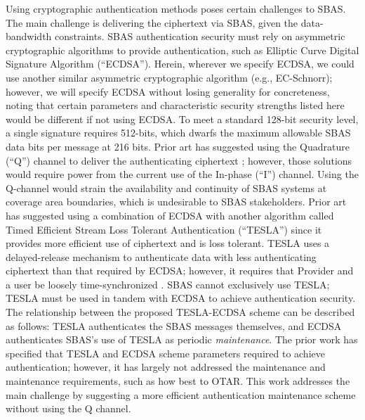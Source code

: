 \documentclass[letterpaper,times]{IONconf/IONconf}
\begin{document}
Using cryptographic authentication methods poses certain challenges to SBAS.
The main challenge is delivering the ciphertext via SBAS, given the data-bandwidth constraints.
SBAS authentication security must rely on asymmetric cryptographic algorithms to provide authentication, such as Elliptic Curve Digital Signature Algorithm (``ECDSA'').
Herein, wherever we specify ECDSA, we could use another similar asymmetric cryptographic algorithm (e.g., EC-Schnorr); however, we will specify ECDSA without losing generality for concreteness, noting that certain parameters and characteristic security strengths listed here would be different if not using ECDSA.
To meet a standard 128-bit security level, a single signature requires 512-bits, which dwarfs the maximum allowable SBAS data bits per message at 216 bits.
Prior art has suggested using the Quadrature (``Q'') channel to deliver the authenticating ciphertext \cite{other_schemes}; however, those solutions would require power from the current use of the In-phase (``I'') channel.
Using the Q-channel would strain the availability and continuity of SBAS systems at coverage area boundaries, which is undesirable to SBAS stakeholders.
Prior art has suggested using a combination of ECDSA with another algorithm called Timed Efficient Stream Loss Tolerant Authentication (``TESLA'') \cite{Neish_Dissertation} since it provides more efficient use of ciphertext and is loss tolerant.
TESLA uses a delayed-release mechanism to authenticate data with less authenticating ciphertext than that required by ECDSA; however, it requires that Provider and a user be loosely time-synchronized \cite{perrig2005timed}.
SBAS cannot exclusively use TESLA; TESLA must be used in tandem with ECDSA to achieve authentication security.
The relationship between the proposed TESLA-ECDSA scheme can be described as follows: TESLA authenticates the SBAS messages themselves, and ECDSA authenticates SBAS's use of TESLA as periodic {\em maintenance}.
The prior work has specified that TESLA and ECDSA scheme parameters required to achieve authentication; however, it has largely not addressed the maintenance and maintenance requirements, such as how best to OTAR.
This work addresses the main challenge by suggesting a more efficient authentication maintenance scheme without using the Q channel.
\end{document}
